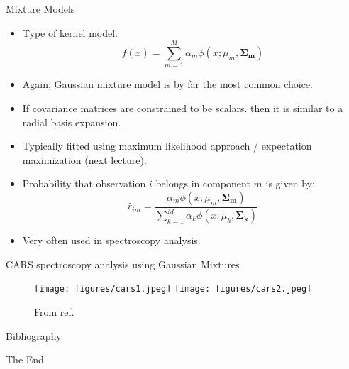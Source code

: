 \documentclass[aspectratio=169]{beamer}
\let \vec \mathbf
\begin{document}
\begin{frame}{Mixture Models}
    \begin{itemize}
        \item Type of kernel model.
        \begin{equation*}
            f(x) = \sum_{m=1}^M \alpha_m \phi(x; \mu_m, \vec{\Sigma_m})
        \end{equation*}
        \item Again, Gaussian mixture model is by far the most common choice.
        \item If covariance matrices are constrained to be scalars. then it is similar to a radial basis expansion.
        \item Typically fitted using maximum likelihood approach / expectation maximization (next lecture).
        \item Probability that observation $i$ belongs in component $m$ is given by:
        \begin{equation*}
            \hat{r}_{im} = \frac{\alpha_m \phi(x; \mu_m, \vec{\Sigma_m})}{\sum_{k=1}^M \alpha_k \phi(x; \mu_k, \vec{\Sigma_k})}
        \end{equation*}
        \item Very often used in spectroscopy analysis.
    \end{itemize}
\end{frame}


\begin{frame}{CARS spectroscopy analysis using Gaussian Mixtures}
\begin{figure}
    \centering
    \texttt{[image: figures/cars1.jpeg]}
    \texttt{[image: figures/cars2.jpeg]}
    \caption{From ref. \cite{voglerSeparationCARSImage2010}}
\end{figure}
\end{frame}


\begin{frame}{Bibliography}
    
    
\end{frame}




\begin{frame}
    \Huge{\centerline{The End}}
\end{frame}
\end{document}
